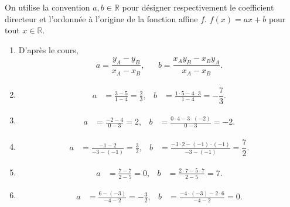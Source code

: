 \documentclass[12pt]{paper}
\theoremstyle{plain}
\theoremstyle{definition}
\newcommand{\R}{\mathbb{R}}
\begin{document}
{
	On utilise la convention $a, b \in \R$ pour désigner respectivement le coefficient directeur et l'ordonnée à l'origine de la fonction affine $f$.
	$f(x) = ax+b$ pour tout $x\in\R$.

	\begin{enumerate}
		\item 
			D'après le cours,
			\begin{align*}
				a = \dfrac{y_A - y_B}{x_A - x_B}, && b = \dfrac{x_A y_B - x_B y_A}{x_A - x_B}.
			\end{align*}
		 \item 
		    \begin{align*}
		        a &= \frac{3-5}{1-4} = \frac{2}{3}, & b &= \frac{1 \cdot 5 - 4 \cdot 3}{1 - 4} = -\dfrac73.
		    \end{align*}
		
		    \item 
		    \begin{align*}
		        a &= \frac{-2 - 4}{0-3} = 2, & b &= \frac{0 \cdot 4 - 3 \cdot (-2)}{0 - 3} = -2.
		    \end{align*}
		    
		    \item
		    \begin{align*}
		        a &= \frac{-1 - 2}{-3 - (-1)} = \frac{3}{2}, & b &= \frac{-3 \cdot 2 - (-1) \cdot (-1)}{-3 - (-1)} = \dfrac72.
		    \end{align*}
		
		    \item
		    \begin{align*}
		        a &= \frac{7 - 7}{2 - 5} = 0, & b &= \frac{2 \cdot 7 - 5 \cdot 7}{2 - 5} = 7.
		    \end{align*}
		
		    \item
		    \begin{align*}
		        a &= \frac{6-(-3)}{-4 - 2} = -\frac{3}{2}, & b &= \frac{-4 \cdot (-3) - 2 \cdot 6}{-4 - 2} = 0.
		    \end{align*}

	\end{enumerate}


}
\end{document}

